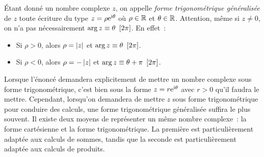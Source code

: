 \documentclass{magnolia}
\begin{document}
\begin{remarques}
\remarque Étant donné un nombre complexe $z$, on appelle
   {\it forme trigonométrique généralisée} de $z$ toute écriture du type
    $z=\rho {\rm e}^{{\rm i}\theta}$ où $\rho\in\mathbb{R}$ et $\theta\in\mathbb{R}$. Attention, même si $z\neq 0$, on n'a pas nécessairement
    $\arg{z}\equiv\theta\ \left[2\pi\right]$. En effet~:
    \begin{itemize}
    \item {Si $\rho>0$}, alors $\rho=\left|z\right|$ et
      $\arg{z}\equiv\theta\ \left[2\pi\right]$.
    \item {Si $\rho<0$}, alors $\rho=-\left|z\right|$ et
      $\arg{z}\equiv\theta+\pi\ \cro{2\pi}$.
    \end{itemize}
  Lorsque l'énoncé demandera explicitement
  de mettre un nombre complexe sous forme trigonométrique, c'est bien
  sous la forme $z=r {\rm e}^{{\rm i}\theta}$ avec $r>0$ qu'il faudra le mettre.
  Cependant, lorsqu'on demandera de mettre $z$ sous forme trigonométrique pour
  conduire des calculs, une forme trigonométrique généralisée suffira le plus
  souvent.
\remarque Il existe deux moyens de représenter un même nombre
  complexe~: la forme cartésienne et la forme trigonométrique. La première
  est particulièrement adaptée aux calculs de sommes, tandis que la seconde
  est particulièrement adaptée aux calculs de produits.
\end{remarques}
\end{document}
